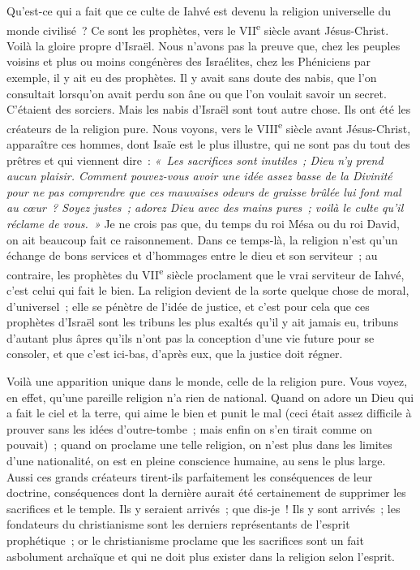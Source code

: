 \documentclass[french,twoside]{book} %
\newcommand\orgName[1]{#1}
\newcommand\persName[1]{#1}
\newcommand\placeName[1]{#1}
\begin{document}
Qu’est-ce qui a fait que ce culte de {\persName Iahvé} est devenu la religion universelle du monde civilisé ? Ce sont les prophètes, vers le VII\textsuperscript{e} siècle avant Jésus-Christ. Voilà la gloire propre d’{\orgName Israël}. Nous n’avons pas la preuve que, chez les peuples voisins et plus ou moins congénères des {\orgName Israélites}, chez les {\orgName Phéniciens} par exemple, il y ait eu des prophètes. Il y avait sans doute des nabis, que l’on consultait lorsqu’on avait perdu son âne ou que l’on voulait savoir un secret. C’étaient des sorciers. Mais les nabis d’{\placeName Israël} sont tout autre chose. Ils ont été les créateurs de la religion pure. Nous voyons, vers le VIII\textsuperscript{e} siècle avant Jésus-Christ, apparaître ces hommes, dont {\persName Isaïe} est le plus illustre, qui ne sont pas du tout des prêtres et qui viennent dire : \emph{« Les sacrifices sont inutiles ; {\persName Dieu} n’y prend aucun plaisir. Comment pouvez-vous avoir une idée assez basse de la {\persName Divinité} pour ne pas comprendre que ces mauvaises odeurs de graisse brûlée lui font mal au cœur ? Soyez justes ; adorez {\persName Dieu} avec des mains pures ; voilà le culte qu’il réclame de vous. »} Je ne crois pas que, du temps du {\persName roi Mésa} ou du {\persName roi David}, on ait beaucoup fait ce raisonnement. Dans ce temps-là, la religion n’est qu’un échange de bons services et d’hommages entre le dieu et son serviteur ; au contraire, les {\orgName prophètes} du VII\textsuperscript{e} siècle proclament que le vrai serviteur de Iahvé, c’est celui qui fait le bien. La religion devient de la sorte quelque chose de moral, d’universel ; elle se pénètre de l’idée de justice, et c’est pour cela que ces {\orgName prophètes d’Israël} sont les tribuns les plus exaltés qu’il y ait jamais eu, tribuns d’autant plus âpres qu’ils n’ont pas la conception d’une vie future pour se consoler, et que c’est ici-bas, d’après eux, que la justice doit régner.\par
Voilà une apparition unique dans le monde, celle de la religion pure. Vous voyez, en effet, qu’une pareille religion n’a rien de national. Quand on adore un {\persName Dieu} qui a fait le ciel et la terre, qui aime le bien et punit le mal (ceci était assez difficile à prouver sans les idées d’outre-tombe ; mais enfin on s’en tirait comme on pouvait) ; quand on proclame une telle religion, on n’est plus dans les limites d’une nationalité, on est en pleine conscience humaine, au sens le plus large. Aussi ces grands créateurs tirent-ils parfaitement les conséquences de leur doctrine, conséquences dont la dernière aurait été certainement de supprimer les sacrifices et le temple. Ils y seraient arrivés ; que dis-je ! Ils y sont arrivés ; les fondateurs du christianisme sont les derniers représentants de l’esprit prophétique ; or le christianisme proclame que les sacrifices sont un fait asbolument archaïque et qui ne doit plus exister dans la religion selon l’esprit.\par
\end{document}
